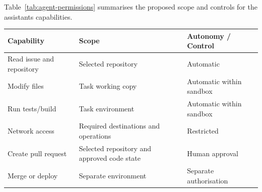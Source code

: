 \noindent\begin{minipage}{\linewidth}
Table~\ref{tab:agent-permissions} summarises the proposed scope and controls for the assistant\textquotesingle s capabilities.\par\vspace{5pt}
\captionsetup{hypcap=false}
\label{tab:agent-permissions}
\small\singlespacing
\renewcommand{\arraystretch}{1.15}
\begin{tabular}{@{}p{4.2cm}p{6.0cm}p{5.3cm}@{}}
\toprule
{\raggedright \textbf{Capability}\par} & {\raggedright \textbf{Scope}\par} & {\raggedright \textbf{Autonomy / Control}\par} \\
\midrule
{\raggedright Read issue and repository\par} & {\raggedright Selected repository\par} & {\raggedright Automatic\par} \\
{\raggedright Modify files\par} & {\raggedright Task working copy\par} & {\raggedright Automatic within sandbox\par} \\
{\raggedright Run tests/build\par} & {\raggedright Task environment\par} & {\raggedright Automatic within sandbox\par} \\
{\raggedright Network access\par} & {\raggedright Required destinations and operations\par} & {\raggedright Restricted\par} \\
{\raggedright Create pull request\par} & {\raggedright Selected repository and approved code state\par} & {\raggedright Human approval\par} \\
{\raggedright Merge or deploy\par} & {\raggedright Separate environment\par} & {\raggedright Separate authorisation\par} \\
\bottomrule
\end{tabular}
\end{minipage}


